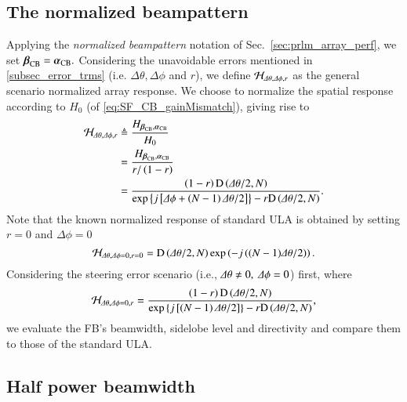 \subsection{The normalized beampattern}
\label{subsection_spatialIIR_normBP}
Applying the \emph{normalized beampattern} notation of Sec.~\ref{sec:prlm_array_perf}, we set $\boldsymbol{\beta}_{\text{CB}}=\boldsymbol{\alpha}_{\text{CB}}.$ 
Considering the unavoidable errors mentioned in \ref{subsec_error_trms} (i.e. $\Delta\theta, \Delta\phi$ and $r$), we define $\mathcal{H}_{\Delta\theta,\Delta\phi,r}$ as the general scenario normalized array response.
We choose to normalize the spatial response according to $H_{0}$ (of \eqref{eq:SF_CB_gainMismatch}), giving rise to
\begin{equation}
    \label{eq_narmalized_pattern}
    \begin{split}
        \mathcal{H}_{\Delta\theta,\Delta\phi,r}&\triangleq
        \frac{
        H_{\boldsymbol{\beta}_{\text{CB}},\boldsymbol{\alpha}_{\text{CB}}}
        }{
        H_{0}
        }\\
        &=
        \frac{
        H_{\boldsymbol{\beta}_{\text{CB}},\boldsymbol{\alpha}_{\text{CB}}}
        }{
        r/\left({1-r}\right)
        }\\
        &=
        \frac{\left({1-r}\right)\text{D}\left({\Delta\theta/2,N}\right)}{\exp\left\{{j\left[{\Delta\phi+\left({N-1}\right)\Delta\theta/2}\right]}\right\}-r\text{D}\left({\Delta\theta/2,N}\right)}.
    \end{split}
\end{equation}
Note that the known \cite{van2004optimum} normalized response of standard ULA is obtained by setting $r=0$ and $\Delta\phi=0$
$$
\mathcal{H}_{\Delta\theta,\Delta\phi=0,r=0}=
             \text{D}\left({\Delta\theta/2,N}\right)\exp\left({-j\left({(N-1)\Delta\theta/2}\right)}\right).
$$
Considering the steering error scenario (i.e., $\Delta\theta\neq0,\ \Delta\phi=0$) first, where 
\begin{equation}\label{eq_Hdphi0}
\mathcal{H}_{\Delta\theta,\Delta\phi=0,r}=
             \frac{\left({1-r}\right)\text{D}\left({\Delta\theta/2,N}\right)}{\exp\left\{{j\left[{\left({N-1}\right)\Delta\theta/2}\right]}\right\}-r\text{D}\left({\Delta\theta/2,N}\right)},
\end{equation}
we evaluate the FB's beamwidth, sidelobe level and directivity and compare them to those of the standard ULA.
\subsection{Half power beamwidth}

